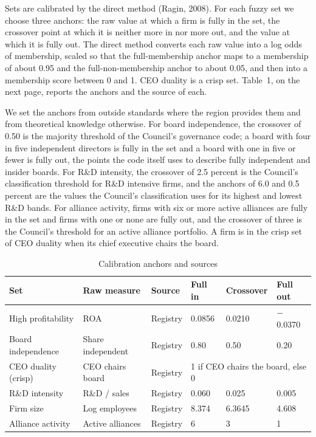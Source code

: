 \documentclass[11pt]{article}
\begin{document}
Sets are calibrated by the direct method (Ragin, 2008). For each fuzzy set we choose three anchors: the raw value at which a firm is fully in the set, the crossover point at which it is neither more in nor more out, and the value at which it is fully out. The direct method converts each raw value into a log odds of membership, scaled so that the full-membership anchor maps to a membership of about 0.95 and the full-non-membership anchor to about 0.05, and then into a membership score between 0 and 1. CEO duality is a crisp set. Table~1, on the next page, reports the anchors and the source of each.

We set the anchors from outside standards where the region provides them and from theoretical knowledge otherwise. For board independence, the crossover of 0.50 is the majority threshold of the Council's governance code; a board with four in five independent directors is fully in the set and a board with one in five or fewer is fully out, the points the code itself uses to describe fully independent and insider boards. For R\&D intensity, the crossover of 2.5 percent is the Council's classification threshold for R\&D intensive firms, and the anchors of 6.0 and 0.5 percent are the values the Council's classification uses for its highest and lowest R\&D bands. For alliance activity, firms with six or more active alliances are fully in the set and firms with one or none are fully out, and the crossover of three is the Council's threshold for an active alliance portfolio. A firm is in the crisp set of CEO duality when its chief executive chairs the board.

\clearpage
\setcounter{table}{0}
\begin{table}[t]
\centering
\small
\caption{Calibration anchors and sources}
\begin{tabular}{llllll}
\toprule
Set & Raw measure & Source & Full in & Crossover & Full out \\
\midrule
High profitability & ROA & Registry & 0.0856 & 0.0210 & $-$0.0370 \\
Board independence & Share independent & Registry & 0.80 & 0.50 & 0.20 \\
CEO duality (crisp) & CEO chairs board & Registry & \multicolumn{3}{l}{1 if CEO chairs the board, else 0} \\
R\&D intensity & R\&D / sales & Registry & 0.060 & 0.025 & 0.005 \\
Firm size & Log employees & Registry & 8.374 & 6.3645 & 4.608 \\
Alliance activity & Active alliances & Registry & 6 & 3 & 1 \\
\bottomrule
\end{tabular}
\end{table}
\end{document}
